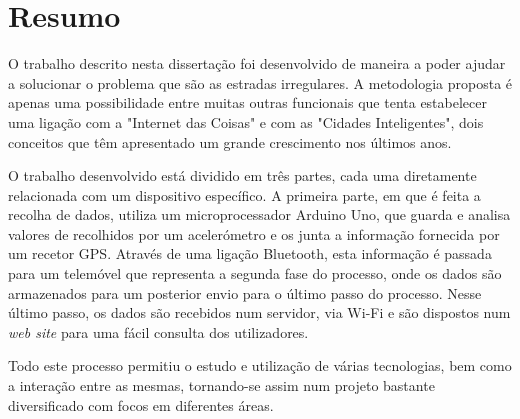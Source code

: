 \chapter{Resumo}
\label{cha:ressumo}

O trabalho descrito nesta dissertação foi desenvolvido de maneira a poder ajudar a solucionar o problema que são as estradas irregulares.
A metodologia proposta é apenas uma possibilidade entre muitas outras funcionais que tenta estabelecer uma ligação com a "Internet das Coisas" e com as "Cidades Inteligentes", dois conceitos que têm apresentado um grande crescimento nos últimos anos.

O trabalho desenvolvido está dividido em três partes, cada uma diretamente relacionada com um dispositivo específico.
A primeira parte, em que é feita a recolha de dados, utiliza um microprocessador Arduino Uno, que guarda e analisa valores de recolhidos por um acelerómetro e os junta a informação fornecida por um recetor GPS.
Através de uma ligação Bluetooth, esta informação é passada para um telemóvel que representa a segunda fase do processo, onde os dados são armazenados para um posterior envio para o último passo do processo.
Nesse último passo, os dados são recebidos num servidor, via Wi-Fi e são dispostos num \emph{web site} para uma fácil consulta dos utilizadores.

Todo este processo permitiu o estudo e utilização de várias tecnologias, bem como a interação entre as mesmas, tornando-se assim num projeto bastante diversificado com focos em diferentes áreas.